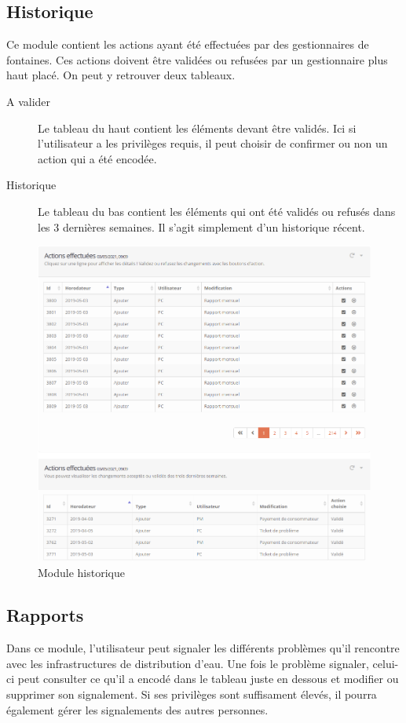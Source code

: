 \documentclass{EPL-master-thesis-covers-FR}
\begin{document}
			\subsection{Historique}
				Ce module contient les actions ayant été effectuées par des gestionnaires de fontaines. Ces actions doivent être validées ou refusées par un gestionnaire plus haut placé. On peut y retrouver deux tableaux.
				\begin{description}
					\item[A valider] Le tableau du haut contient les éléments devant être validés. Ici si l'utilisateur a les privilèges requis, il peut choisir de confirmer ou non un action qui a été encodée.
					\item[Historique] Le tableau du bas contient les éléments qui ont été validés ou refusés dans les 3 dernières semaines. Il s'agit simplement d'un historique récent.
				\end{description}
				\begin{figure}[H]
					\centering
					\includegraphics[width=1\textwidth]{images/logs}
					\caption{Module historique}
				\end{figure}
			
			\subsection{Rapports}
				Dans ce module, l'utilisateur peut signaler les différents problèmes qu'il rencontre avec les infrastructures de distribution d'eau. Une fois le problème signaler, celui-ci peut consulter ce qu'il a encodé dans le tableau juste en dessous et modifier ou supprimer son signalement. Si ses privilèges sont suffisament élevés, il pourra également gérer les signalements des autres personnes.
				
\end{document}
